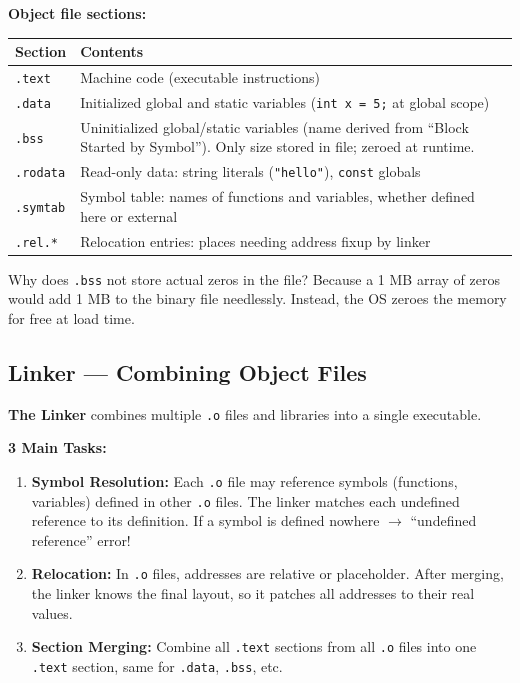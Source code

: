 \documentclass[11pt,a4paper]{article}
\newcommand{\code}[1]{\texttt{\small\colorbox{codebg}{\color{codekw}#1}}}
\newcommand{\term}[1]{\textbf{\color{darkblue}#1}}
\begin{document}
\textbf{Object file sections:}
\begin{center}
\begin{tabular}{L{2.5cm} L{11cm}}
\toprule
\textbf{Section} & \textbf{Contents} \\
\midrule
\code{.text}   & Machine code (executable instructions) \\
\code{.data}   & Initialized global and static variables (\code{int x = 5;} at global scope) \\
\code{.bss}    & Uninitialized global/static variables (name derived from ``Block Started by Symbol''). Only size stored in file; zeroed at runtime. \\
\code{.rodata} & Read-only data: string literals (\code{"hello"}), \code{const} globals \\
\code{.symtab} & Symbol table: names of functions and variables, whether defined here or external \\
\code{.rel.*}  & Relocation entries: places needing address fixup by linker \\
\bottomrule
\end{tabular}
\end{center}

\begin{keypoint}
Why does \code{.bss} not store actual zeros in the file? Because a 1 MB array of zeros would add 1 MB to the binary file needlessly. Instead, the OS zeroes the memory for free at load time.
\end{keypoint}

\subsection{Linker --- Combining Object Files}

\textbf{The Linker} combines multiple \texttt{.o} files and libraries into a single executable.

\textbf{3 Main Tasks:}
\begin{enumerate}[noitemsep]
  \item \term{Symbol Resolution:} Each \texttt{.o} file may reference symbols (functions, variables) defined in other \texttt{.o} files. The linker matches each undefined reference to its definition. If a symbol is defined nowhere $\to$ ``undefined reference'' error!
  \item \term{Relocation:} In \texttt{.o} files, addresses are relative or placeholder. After merging, the linker knows the final layout, so it patches all addresses to their real values.
  \item \term{Section Merging:} Combine all \code{.text} sections from all \texttt{.o} files into one \code{.text} section, same for \code{.data}, \code{.bss}, etc.
\end{enumerate}
\end{document}
